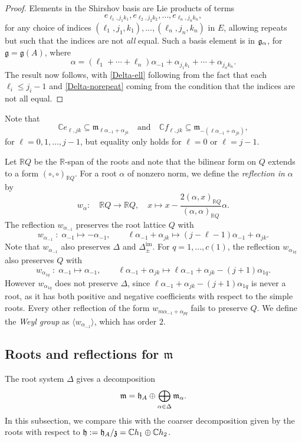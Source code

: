 \documentclass[11pt,letterpaper]{amsart}
\numberwithin{thecounter}{section}
\theoremstyle{definition}
\DeclareMathOperator{\im}{{im}}
\renewcommand{\a}{\alpha}
\newcommand{\R}{{\mathbb R}}
\newcommand{\C}{{\mathbb C}}
\begin{document}
\begin{longver}
\begin{proof}  Elements in the Shirshov basis \cite{shirshov2009bases} are Lie products of terms
$$ e_{\ell_1,j_1 k_1}, e_{\ell_2,j_2 k_2},\dots,e_{\ell_n,j_n k_n},$$
for any choice of indices $\left(\ell_1,j_1, k_1 \right),\dots,\left(\ell_n,j_n, k_n \right)$ in $E$,  allowing repeats but  such that the indices are not \emph{all} equal.
Such a basis element is in $\frak g_\a$,  for $\mathfrak{g}=\mathfrak g(A)$, where
$$\a= \left(\ell_1+\cdots+\ell_n \right) \a_{-1}+\a_{j_1k_1}+\cdots+\a_{j_nk_n}.$$
The result now follows, with \eqref{Delta-ell} following from the fact that each $\ell_i\le j_i-1$ and  \eqref{Delta-norepeat} coming from the condition that the indices are not all equal.
\end{proof}
\end{longver}
Note that  
 $$\C e_{\ell,jk}\subseteq{\mathfrak m}_{\ell\a_{-1}+\a_{jk}}  \quad\text{and}\quad 
    \C f_{\ell,jk}\subseteq{\mathfrak m}_{-(\ell\a_{-1}+\a_{jk})}, $$
for $\ell=0,1,\dots, j-1$, but equality only holds for $\ell=0$ or $\ell=j-1$.

Let $\R Q$ be the $\R$-span of the roots and note that the bilinear form on $Q$ extends to a form $(\circ,\circ)_{\R Q}$. 
For a root $\a$ of nonzero norm, we define the \emph{reflection in $\a$} by
$$ w_\a:\quad \R Q \to \R Q, \quad x\mapsto x-\frac{2(\a,x)_{\R Q}}{(\a,\a)_{\R Q}}\a.$$
The reflection $w_{{\a}_{-1}}$ preserves the root lattice $Q$ with
$${w}_{\a_{-1}}\;  :\; \a_{-1}\mapsto-\a_{-1}, \qquad \ell \a_{-1}+\a_{jk}\mapsto (j-\ell-1) \a_{-1}+\a_{jk}.$$
Note that $w_{\a_{-1}}$ also preserves $\Delta$ and $\Delta^{\im}_{\pm}$.
For $q=1,\dots,c(1)$, the reflection $w_{\a_{1q}}$ also preserves $Q$ with
$${w}_{\a_{1q}}\;  :\; \a_{-1}\mapsto \a_{-1}, \qquad \ell \a_{-1}+\a_{jk}\mapsto\ell \a_{-1}+\a_{jk}-(j+1)\a_{1q}.$$
However ${w}_{\a_{1q}}$ does not preserve $\Delta$, since $\ell \a_{-1}+\a_{jk}-(j+1)\a_{1q}$ is never a root, as it has both positive and negative coefficients with respect to the simple roots.
Every other reflection of the form $w_{m\a_{-1}+\a_{pq}}$ fails to preserve $Q$.
We define the \emph{Weyl group} 
as $\langle w_{\a_{-1}}\rangle$, which  has order $2$.





\subsection{Roots and reflections for $\mathfrak m$}\label{SS-mroots}
The root system $\Delta$ gives a %
decomposition
$$\frak m = \frak h_A \oplus \bigoplus_{\a\in\Delta} \frak m_\a.$$
In this subsection, we compare this with the coarser decomposition given by the roots with respect to  $\frak h:={\frak h}_A/{\frak z} = \C h_1 \oplus \C h_2$.
\end{document}
